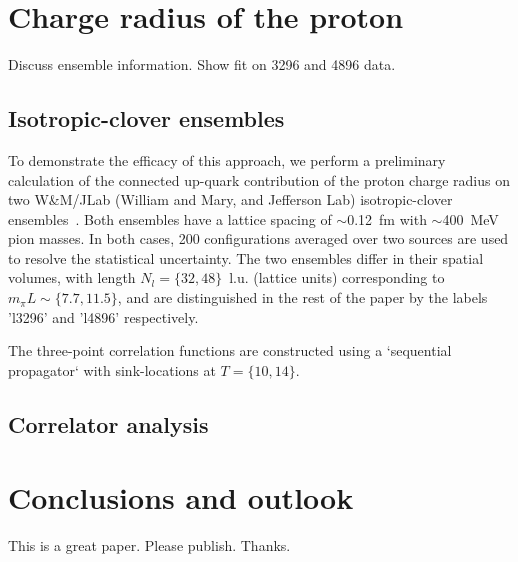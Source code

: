 \documentclass[prd,aps,twocolumn,superscriptaddress,tightenlines,nofootinbib,floatfix,preprintnumbers,10pt]{revtex4-1}
\begin{document}
\section{Charge radius of the proton}
{\color{red} Discuss ensemble information. Show fit on 3296 and 4896 data.}
\subsection{Isotropic-clover ensembles}
To demonstrate the efficacy of this approach, we perform a preliminary calculation of the connected up-quark contribution of the proton charge radius on two W\&M/JLab (William and Mary, and Jefferson Lab) isotropic-clover ensembles~\cite{}. Both ensembles have a lattice spacing of $\sim$0.12~fm with $\sim$400~MeV pion masses. In both cases, 200 configurations averaged over two sources are used to resolve the statistical uncertainty. The two ensembles differ in their spatial volumes, with length $N_l = \{32,48\}$~l.u. (lattice units) corresponding to $m_\pi L\sim \{7.7,11.5\}$, and are distinguished in the rest of the paper by the labels 'l3296' and 'l4896' respectively.

The three-point correlation functions are constructed using a `sequential propagator` with sink-locations at $T=\{10,14\}$.

\subsection{Correlator analysis}


\section{Conclusions and outlook}
This is a great paper. Please publish. Thanks.

\end{document}
